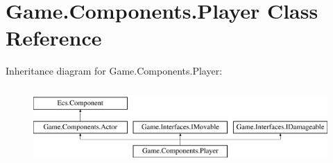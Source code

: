 \hypertarget{class_game_1_1_components_1_1_player}{}\section{Game.\+Components.\+Player Class Reference}
\label{class_game_1_1_components_1_1_player}
Inheritance diagram for Game.\+Components.\+Player\+:\begin{figure}[H]
\begin{center}
\leavevmode
\includegraphics[height=2.962963cm]{class_game_1_1_components_1_1_player}
\end{center}
\end{figure}
